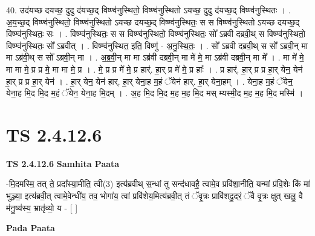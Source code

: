 \documentclass[17pt]{extarticle}
\begin{document}
40. उद॑यच्छ दयच्छ॒ दुदु द॑यच्छ॒द् विष्ण्व॑नुस्थितो॒ विष्ण्व॑नुस्थितो ऽयच्छ॒ दुदु द॑यच्छ॒द् विष्ण्व॑नुस्थितः । . अ॒य॒च्छ॒द् विष्ण्व॑नुस्थितो॒ विष्ण्व॑नुस्थितो ऽयच्छ दयच्छ॒द् विष्ण्व॑नुस्थितः॒ स स विष्ण्व॑नुस्थितो ऽयच्छ दयच्छ॒द् विष्ण्व॑नुस्थितः॒ सः । . विष्ण्व॑नुस्थितः॒ स स विष्ण्व॑नुस्थितो॒ विष्ण्व॑नुस्थितः॒ सो᳚ ऽब्रवी दब्रवी॒थ् स विष्ण्व॑नुस्थितो॒ विष्ण्व॑नुस्थितः॒ सो᳚ ऽब्रवीत् । . विष्ण्व॑नुस्थित॒ इति॒ विष्णु॑ - अ॒नु॒स्थि॒तः॒ । . सो᳚ ऽब्रवी दब्रवी॒थ् स सो᳚ ऽब्रवी॒न् मा मा ऽब्र॑वी॒थ् स सो᳚ ऽब्रवी॒न् मा । . अ॒ब्र॒वी॒न् मा मा ऽब्र॑वी दब्रवी॒न् मा मे॑ मे॒ मा ऽब्र॑वी दब्रवी॒न् मा मे᳚ । . मा मे॑ मे॒ मा मा मे॒ प्र प्र मे॒ मा मा मे॒ प्र । . मे॒ प्र प्र मे॑ मे॒ प्र हार्॑. हा॒र् प्र मे॑ मे॒ प्र हाः᳚ । . प्र हार्॑. हा॒र् प्र प्र हा॒र् येन॒ येन॑ हा॒र् प्र प्र हा॒र् येन॑ । . हा॒र् येन॒ येन॑ हार्. हा॒र् येना॒ह म॒हं ॅयेन॑ हार्. हा॒र् येना॒हम् । . येना॒ह म॒हं ॅयेन॒ येना॒ह मि॒द मि॒द म॒हं ॅयेन॒ येना॒ह मि॒दम् । . अ॒ह मि॒द मि॒द म॒ह म॒ह मि॒द मस् म्यस्मी॒द म॒ह म॒ह मि॒द मस्मि॑ । \newline
\pagebreak
{}
\section*{ TS 2.4.12.6 }

\textbf{TS 2.4.12.6 } \newline
\textbf{Samhita Paata} \newline

-मि॒दमस्मि॒ तत् ते॒ प्रदा᳚स्या॒मीति॒ त्वी(3) इत्य॑ब्रवीथ् स॒न्धां तु सन्द॑धावहै॒ त्वामे॒व प्रवि॑शा॒नीति॒ यन्मां प्र॑वि॒शेः किं मा॑ भुञ्ज्या॒ इत्य॑ब्रवी॒त् त्वामे॒वेन्धी॑य॒ तव॒ भोगा॑य॒ त्वां प्रवि॑शेय॒मित्य॑ब्रवी॒त् तं ॅवृ॒त्रः प्रावि॑शदु॒दरं॒ ॅवै वृ॒त्रः क्षुत् खलु॒ वै म॑नु॒ष्य॑स्य॒ भ्रातृ॑व्यो॒ य - [  ] \newline

\textbf{Pada Paata} \newline
\end{document}
